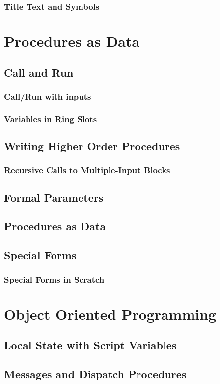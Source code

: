 \documentclass{report}
\begin{document}
\subsection{Title Text and Symbols}
\chapter{Procedures as Data}
\section{Call and Run}
\subsection{Call/Run with inputs}
\subsection{Variables in Ring Slots}
\section{Writing Higher Order Procedures}
\subsection{Recursive Calls to Multiple-Input Blocks}
\section{Formal Parameters}
\section{Procedures as Data}
\section{Special Forms}
\subsection{Special Forms in Scratch}
\chapter{Object Oriented Programming}
\section{Local State with Script Variables}
\section{Messages and Dispatch Procedures}
\end{document}
